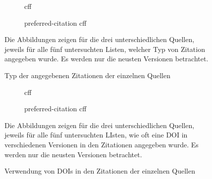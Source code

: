 \begin{figure}
    \begin{subfigure}{.5\textwidth}
        \centering
        
        \caption{\gls{cff}}
        \label{fig:citation_counts_cff}
    \end{subfigure}%
    \begin{subfigure}{.5\textwidth}
        \centering
        
        \caption{\glqq preferred-citation\grqq{} \gls{cff}}
        \label{fig:citation_counts_preferred_citation_cff}
    \end{subfigure}
    \centering
    \begin{subfigure}{.5\textwidth}
        \centering
        
        \caption{}
        \label{fig:citation_counts_bib}
    \end{subfigure}
    \caption{Typ der angegebenen Zitationen der einzelnen Quellen}
    \small
    \raggedright
    Die Abbildungen zeigen für die drei unterschiedlichen Quellen, jeweils für alle fünf untersuchten Listen, welcher Typ von Zitation angegeben wurde. Es werden nur die neusten Versionen betrachtet.
\end{figure}

\begin{figure}
    \begin{subfigure}{.5\textwidth}
        \centering
        
        \caption{\gls{cff}}
        \label{fig:cff_doi}
    \end{subfigure}%
    \begin{subfigure}{.5\textwidth}
        \centering
        
        \caption{\glqq preferred-citation\grqq{} \gls{cff}}
        \label{fig:preferred_citation_doi}
    \end{subfigure}
    \centering
    \begin{subfigure}{.5\textwidth}
        \centering
        
        \caption{}
        \label{fig:bib_doi}
    \end{subfigure}
    \caption{Verwendung von DOIs in den Zitationen der einzelnen Quellen}
    \small
    \raggedright
    Die Abbildungen zeigen für die drei unterschiedlichen Quellen, jeweils für alle fünf untersuchten LIsten, wie oft eine DOI in verschiedenen Versionen in den Zitationen angegeben wurde. Es werden nur die neusten Versionen betrachtet.
\end{figure}


